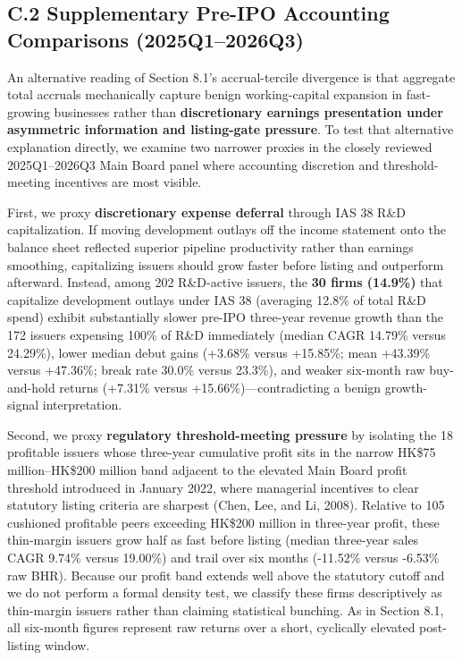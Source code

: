 \documentclass[11pt,letterpaper]{article}
\begin{document}
\subsection*{\texorpdfstring{C.2 Supplementary Pre-IPO Accounting Comparisons (2025Q1–2026Q3)}{C.2 Supplementary Pre-IPO Accounting Comparisons (2025Q1–2026Q3)}}
An alternative reading of Section 8.1's accrual-tercile divergence is that aggregate total accruals mechanically capture benign working-capital expansion in fast-growing businesses rather than \textbf{discretionary earnings presentation under asymmetric information and listing-gate pressure}. To test that alternative explanation directly, we examine two narrower proxies in the closely reviewed 2025Q1–2026Q3 Main Board panel where accounting discretion and threshold-meeting incentives are most visible.

First, we proxy \textbf{discretionary expense deferral} through IAS 38 R\&D capitalization. If moving development outlays off the income statement onto the balance sheet reflected superior pipeline productivity rather than earnings smoothing, capitalizing issuers should grow faster before listing and outperform afterward. Instead, among 202 R\&D-active issuers, the \textbf{30 firms (14.9\%)} that capitalize development outlays under IAS 38 (averaging 12.8\% of total R\&D spend) exhibit substantially slower pre-IPO three-year revenue growth than the 172 issuers expensing 100\% of R\&D immediately (median CAGR 14.79\% versus 24.29\%), lower median debut gains (+3.68\% versus +15.85\%; mean +43.39\% versus +47.36\%; break rate 30.0\% versus 23.3\%), and weaker six-month raw buy-and-hold returns (+7.31\% versus +15.66\%)—contradicting a benign growth-signal interpretation.

Second, we proxy \textbf{regulatory threshold-meeting pressure} by isolating the 18 profitable issuers whose three-year cumulative profit sits in the narrow HK\$75 million–HK\$200 million band adjacent to the elevated Main Board profit threshold introduced in January 2022, where managerial incentives to clear statutory listing criteria are sharpest (Chen, Lee, and Li, 2008). Relative to 105 cushioned profitable peers exceeding HK\$200 million in three-year profit, these thin-margin issuers grow half as fast before listing (median three-year sales CAGR 9.74\% versus 19.00\%) and trail over six months (-11.52\% versus -6.53\% raw BHR). Because our profit band extends well above the statutory cutoff and we do not perform a formal density test, we classify these firms descriptively as thin-margin issuers rather than claiming statistical bunching. As in Section 8.1, all six-month figures represent raw returns over a short, cyclically elevated post-listing window.
\end{document}
